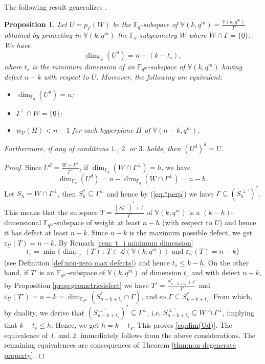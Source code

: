 \documentclass[11pt]{amsart}
\newtheorem{proposition}[theorem]{Proposition}
\newcommand{\fqm}{\mathbb{F}_{q^m}}
\newcommand{\F}{{\mathbb F}}
\newcommand{\fq}{{\mathbb F}_{q}}
\begin{document}
The following result generalizes \cite[Proposition 3.1]{csajbok2021generalising}.

\begin{proposition} \label{prop:Gamma_perp} 
Let $U=p_{\Gamma}(W)$ be the $\fq$-subspace of $\mathbb{V}(k,q^m)=\frac{\mathbb{V}(n,q^m)}{\Gamma}$ obtained by projecting in $\mathbb{V}(k,q^m)$ the $\fq$-subgeometry  $W$ where $W\cap \Gamma=\{\underline 0\}$.
We have
\begin{equation}\label{eq:dim(Ud)}
\dim_{\fq}(U^d)=n-(k-t_s),
\end{equation}
where $t_s$ is the minimum dimension of an $\F_{q^m}$-subspace of $\mathbb{V}(k,q^m)$ having defect $n-k$ with respect to $U$. Moreover, the following are equivalent:
\begin{itemize}
    \item[1.]  $\dim_{\fq} (U^d)=n$;
    \item[2.] $\Gamma^\perp \cap W=\{\underline 0\}$;
    \item[3.] $w_{U}(H)< n-1$ for each hyperplane $H$ of $\mathbb{V}(n-k,q^m)$. 
\end{itemize}
Furthermore, if any of conditions  $1.$, $2.$ or $3.$ holds, then $(U^d)^d=U$.
\end{proposition}
\begin{proof}
Since $U^d=\frac{W+\Gamma^\perp}{\Gamma^\perp}$, if $\dim_{\fq}(W\cap \Gamma^{\perp})=h$, we have
\[ \dim_{\fq}(U^d)=n-\dim_{\fq}(W\cap \Gamma^{\perp})=n-h.\]
Let $S_h=W\cap \Gamma^{\perp}$, then $S_h^* \subseteq \Gamma^{\perp}$ and hence by (\ref{eq:*perp}) we have $\Gamma \subseteq (S_h^{\perp'})^*$. This means that the subspace $T=\frac{(S_h^{\perp'})^*+\Gamma}{\Gamma}$ of $\mathbb{V}(k,q^m)$ is a $(k-h)$-dimensional $\F_{q^m}$-subspace of weight at least $n-h$ (with respect to $U$) and hence it has defect at least $n-k$. Since $n-k$ is the maximum possible defect, we get $\varepsilon_U(T)=n-k$. By Remark \ref{rem: t_i minimum dimension}
\[t_s=\min\{\dim_{\fqm}(T) \,:\, T\in\mathcal{L}(\mathbb{V}(k,q^m))\,\,\text{and}\,\, \varepsilon_U(T)=n-k\}\]
(see Definition \ref{def:non-zero max defects}) and hence   $t_s\leq k-h$. 
 On the other hand, if  $T'$ is an $\F_{q^m}$-subspace of $\mathbb{V}(k,q^m)$ of dimension $t_s$ and  with defect $n-k$,  by Proposition \ref{prop:geometricdefect} we have $T'=\frac{S_{n-k+t_s}^*+\Gamma}{\Gamma}$ and $\varepsilon_{U}(T')=n-k=\dim_{\fqm}(S_{n-k+t_s}^*\cap \Gamma)$, and so $\Gamma \subseteq S_{n-k+t_s}^*$. From which, by duality, we derive that $(S_{n-k+t_s}^{\perp'})^* \subseteq \Gamma^{\perp} $, i.e. $S_{n-k+t_s}^{\perp'} \subseteq W\cap \Gamma^{\perp}$, implying that $k-t_s \leq h$. Hence, we get $h=k-t_s$. This proves \eqref{eq:dim(Ud)}. 
 The equivalence of {\it 1.} and {\it 2.} immediately follows from the above considerations. 
 The remaining equivalences are consequences of Theorem \ref{thm:non degenerate property}.
\end{proof}
\end{document}
